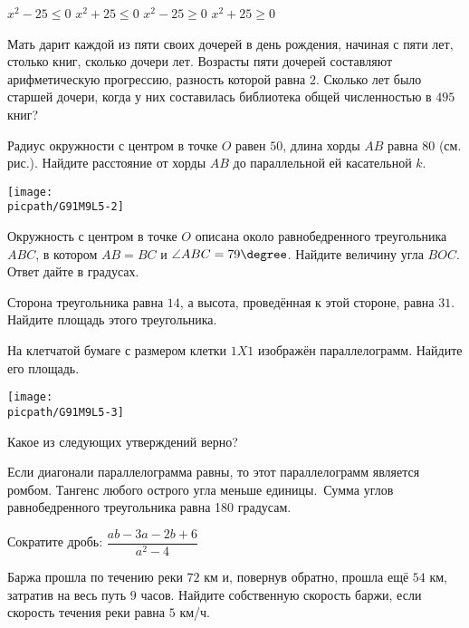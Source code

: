 \begin{class}[number=5]
\begin{listofex}
\begin{tasks}
			\task \( x^2-25\le0 \)
			\task \( x^2+25\le0 \)
			\task\( x^2-25\ge0 \)
			\task \( x^2+25\ge0 \)
		\end{tasks}
		\item Мать дарит каждой из пяти своих дочерей в день рождения, начиная с пяти лет, столько книг, сколько дочери лет. Возрасты пяти дочерей составляют арифметическую прогрессию, разность которой равна \( 2 \). Сколько лет было старшей дочери, когда у них составилась библиотека общей численностью в \( 495 \) книг?
		\item 
		\begin{minipage}[t]{\bodywidth}
			Радиус окружности с центром в точке \( O \) равен \( 50 \), длина хорды	\( AB \) равна \( 80 \) (см. рис.). Найдите расстояние от хорды \( AB \) до параллельной ей касательной \( k \).
		\end{minipage}
		\gapwidth
		\begin{minipage}[t]{\picwidth}
			\texttt{[image: \\picpath/G91M9L5-2]}
		\end{minipage}
		\item Окружность с центром в точке \( O \) описана около равнобедренного треугольника \( ABC \), в котором \( AB=BC \) и \( \angle ABC=79\degree \). Найдите величину угла \( BOC	 \). Ответ дайте в градусах.
		\item Сторона треугольника равна \( 14 \), а высота, проведённая к этой стороне, равна \( 31 \). Найдите площадь этого треугольника.
		\item
		\begin{minipage}[t]{\bodywidth}
			На клетчатой бумаге с размером клетки \( 1X1 \) изображён параллелограмм. Найдите его площадь.
		\end{minipage}
		\gapwidth
		\begin{minipage}[t]{\picwidth}
			\texttt{[image: \\picpath/G91M9L5-3]}
		\end{minipage}
		\item Какое из следующих утверждений верно?
		\begin{tasks}
			\task Если диагонали параллелограмма равны, то этот параллелограмм является ромбом.
			\task Тангенс любого острого угла меньше единицы.
			\task Сумма углов равнобедренного треугольника равна 180 градусам.
		\end{tasks}
		\item Сократите дробь: \( \dfrac{ab-3a-2b+6}{a^2-4} \)
		\item Баржа прошла по течению реки \( 72 \) км и, повернув обратно, прошла ещё \( 54 \) км, затратив на	весь путь \( 9 \) часов. Найдите собственную скорость баржи, если скорость течения реки равна \( 5 \) км/ч.

\end{listofex}
\end{class}
